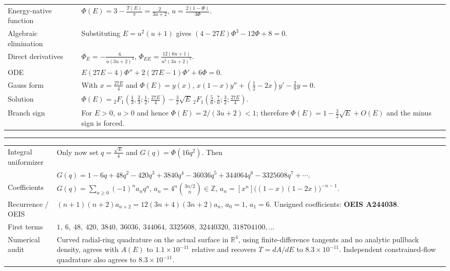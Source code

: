 \documentclass[10pt]{article}
\newcommand{\Z}{\mathbb Z}
\newcommand{\Fh}[4]{{}_2F_1\!\left(#1,#2;#3;#4\right)}
\begin{document}
\begin{tabularx}{\textwidth}{L M}
Energy-native function &
$\displaystyle \Phi(E)=3-\frac{T(E)}{\pi}=\frac{2}{3u+2}$, \qquad
$\displaystyle u=\frac{2(1-\Phi)}{3\Phi}$.\\[4pt]
Algebraic elimination &
Substituting $E=u^2(u+1)$ gives
$\displaystyle (4-27E)\Phi^3-12\Phi+8=0$.\\[3pt]
Direct derivatives &
$\displaystyle \Phi_E=-\frac{6}{u(3u+2)^3}$, \qquad
$\displaystyle \Phi_{EE}=\frac{12(6u+1)}{u^3(3u+2)^5}$.\\[4pt]
ODE &
$\displaystyle E(27E-4)\Phi''+2(27E-1)\Phi'+6\Phi=0$.\\[3pt]
Gauss form &
With $\displaystyle x=\frac{27E}{4}$ and $\Phi(E)=y(x)$,
$\displaystyle x(1-x)y''+\left(\frac12-2x\right)y'-\frac29y=0$.\\[4pt]
Solution &
$\displaystyle \Phi(E)=
\Fh{\frac13}{\frac23}{\frac12}{\frac{27E}{4}}
-\frac32\sqrt E\,
\Fh{\frac56}{\frac76}{\frac32}{\frac{27E}{4}}$.\\[5pt]
Branch sign &
For $E>0$, $u>0$ and hence $\Phi(E)=2/(3u+2)<1$; therefore
$\displaystyle \Phi(E)=1-\frac32\sqrt E+O(E)$ and the minus sign is forced.\\
\end{tabularx}

\vspace{4pt}\hrule\vspace{5pt}

\begin{tabularx}{\textwidth}{L M}
Integral uniformizer &
Only now set $\displaystyle q=\frac{\sqrt E}{4}$ and $G(q)=\Phi(16q^2)$. Then\\[-1pt]
& $\displaystyle G(q)=1-6q+48q^2-420q^3+3840q^4-36036q^5+344064q^6-3325608q^7+\cdots$.\\[4pt]
Coefficients &
$\displaystyle G(q)=\sum_{n\ge0}(-1)^na_nq^n$, \qquad
$\displaystyle a_n=4^n\binom{3n/2}{n}\in\Z$, \qquad
$\displaystyle a_n=[x^n]\big((1-x)(1-2x)\big)^{-n-1}$.\\[5pt]
Recurrence / OEIS &
$\displaystyle (n+1)(n+2)a_{n+2}=12(3n+4)(3n+2)a_n$, \quad
$a_0=1$, $a_1=6$. \quad Unsigned coefficients: \textbf{OEIS A244038}.\\[2pt]
First terms &
$1,\ 6,\ 48,\ 420,\ 3840,\ 36036,\ 344064,\ 3325608,\ 32440320,\ 318704100,\ldots$\\
Numerical audit &
Curved radial-ring quadrature on the actual surface in $\mathbb R^4$, using finite-difference tangents and no analytic pullback density, agrees with $A(E)$ to $1.1\times10^{-11}$ relative and recovers $T=dA/dE$ to $8.3\times10^{-11}$. Independent constrained-flow quadrature also agrees to $8.3\times10^{-11}$.\\
\end{tabularx}
\end{document}
